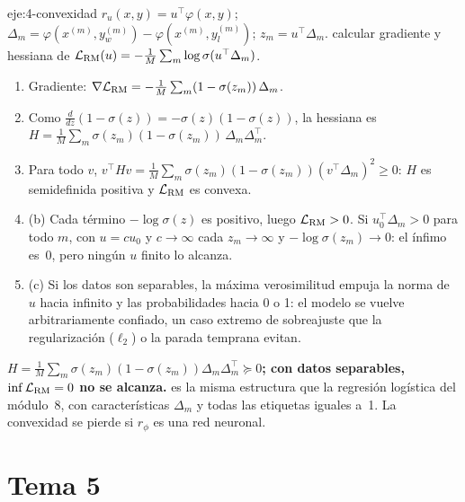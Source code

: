 \begin{solucion}{eje:4-convexidad}
\datos $r_u(x,y)=u^{\top}\varphi(x,y)$; $\Delta_m=\varphi(x^{(m)},y_w^{(m)})-\varphi(x^{(m)},y_l^{(m)})$; $z_m=u^{\top}\Delta_m$.
\planteamiento calcular gradiente y hessiana de $\mathcal{L}_{\mathrm{RM}}(u)=-\frac1M\sum_m\log\sigma(u^{\top}\Delta_m)$.
\pasos
\begin{enumerate}[label=\arabic*.]
  \item Gradiente: $\nabla\mathcal{L}_{\mathrm{RM}}=-\frac1M\sum_m(1-\sigma(z_m))\,\Delta_m$.
  \item Como $\frac{d}{dz}(1-\sigma(z))=-\sigma(z)(1-\sigma(z))$, la hessiana es $H=\frac1M\sum_m\sigma(z_m)(1-\sigma(z_m))\,\Delta_m\Delta_m^{\top}$.
  \item Para todo $v$, $v^{\top}Hv=\frac1M\sum_m\sigma(z_m)(1-\sigma(z_m))(v^{\top}\Delta_m)^{2}\ge 0$: $H$ es semidefinida positiva y $\mathcal{L}_{\mathrm{RM}}$ es convexa.
  \item (b) Cada término $-\log\sigma(z)$ es positivo, luego $\mathcal{L}_{\mathrm{RM}}>0$. Si $u_0^{\top}\Delta_m>0$ para todo $m$, con $u=cu_0$ y $c\to\infty$ cada $z_m\to\infty$ y $-\log\sigma(z_m)\to 0$: el ínfimo es~0, pero ningún $u$ finito lo alcanza.
  \item (c) Si los datos son separables, la máxima verosimilitud empuja la norma de $u$ hacia infinito y las probabilidades hacia 0 o 1: el modelo se vuelve arbitrariamente confiado, un caso extremo de sobreajuste que la regularización ($\ell_2$) o la parada temprana evitan.
\end{enumerate}
\resultado \textbf{$H=\frac1M\sum_m\sigma(z_m)(1-\sigma(z_m))\Delta_m\Delta_m^{\top}\succeq 0$; con datos separables, $\inf\mathcal{L}_{\mathrm{RM}}=0$ no se alcanza.}
\comprobacion es la misma estructura que la regresión logística del módulo~8, con características $\Delta_m$ y todas las etiquetas iguales a~1. La convexidad se pierde si $r_\phi$ es una red neuronal.
\end{solucion}

\section{Tema 5}

